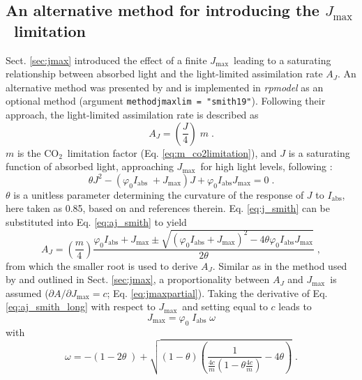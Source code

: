 \documentclass{myreport}
\newcommand{\coo}{CO$_2$}
\newcommand{\jmax}{$J_{\text{max}}$}
\begin{document}
\subsection{An alternative method for introducing the \jmax\ limitation}
\label{sec:jmaxlim_smith}
Sect. \ref{sec:jmax} introduced the effect of a finite \jmax\, leading to a saturating relationship between absorbed light and the light-limited assimilation rate $A_J$. An alternative method was presented by \citet{smith19ecollett} and is implemented in \textit{rpmodel} as an optional method (argument \texttt{method\textunderscore jmaxlim = "smith19"}). Following their approach, the light-limited assimilation rate is described as
\begin{equation}
\label{eq:aj_smith}
    A_J = \left(\frac{J}{4} \right) \; m \;.
\end{equation}
$m$ is the \coo\ limitation factor (Eq. \ref{eq:m_co2limitation}), and $J$ is a saturating function of absorbed light, approaching \jmax\ for high light levels, following \citet{farquhar84}:
\begin{equation}
\label{eq:j_smith}
   \theta  J^2 - 
    \left(
    \varphi_0  I_{\mathrm{abs}} \; + J_{\mathrm{max}}
    \right)  J +
     \varphi_0 I_{\mathrm{abs}}  J_{\mathrm{max}} = 0 \;.  
\end{equation}
$\theta$ is a unitless parameter determining the curvature of the response of $J$ to $I_{\mathrm{abs}}$, here taken as 0.85, based on \citet{smith19ecollett} and references therein. Eq. \ref{eq:j_smith} can be substituted into Eq. \ref{eq:aj_smith} to yield
\begin{equation}
\label{eq:aj_smith_long}
    A_J = \left( \frac{m}{4} \right)
    \frac{\varphi_0 I_{\mathrm{abs}} + J_{\mathrm{max}} \pm 
    \sqrt{
    \left(\varphi_0 I_{\mathrm{abs}} + J_{\mathrm{max}} \right)^2 -
    4  \theta \varphi_0 I_{\mathrm{abs}} J_{\mathrm{max}}}}
    {2 \theta} \;,
\end{equation}
from which the smaller root is used to derive $A_J$. Similar as in the method used by \citet{wang17natpl} and outlined in Sect. \ref{sec:jmax}, a proportionality between $A_J$ and \jmax\ is assumed ($\partial A / \partial J_{\mathrm{max}} = c$; Eq. \ref{eq:jmaxpartial}). Taking the derivative of Eq. \ref{eq:aj_smith_long} with respect to \jmax\ and setting equal to $c$ leads to 
\begin{equation}
    J_{\mathrm{max}} = \varphi_0 \; I_{\mathrm{abs}} \; \omega
\end{equation}
with
\begin{equation}
    \omega = - \left(1 - 2 \theta \; \right) +
    \sqrt{\left(1 - \theta \right)
    \left(
    \frac{1}{
    \frac{4  c}{m}
    \left(1 - \theta 
    \frac{4  c}{m}\right)
    } - 4  \theta \right) }\;.
\end{equation}
\end{document}
